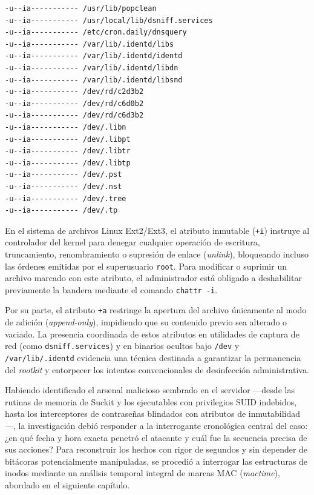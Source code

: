 \begin{lstlisting}[style=terminal,caption={Archivos con atributos especiales de inmutabilidad (+i) y adición (+a).},label={lst:lsattr_output}]
-u--ia----------- /usr/lib/popclean
-u--ia----------- /usr/local/lib/dsniff.services
-u--ia----------- /etc/cron.daily/dnsquery
-u--ia----------- /var/lib/.identd/libs
-u--ia----------- /var/lib/.identd/identd
-u--ia----------- /var/lib/.identd/libdn
-u--ia----------- /var/lib/.identd/libsnd
-u--ia----------- /dev/rd/c2d3b2
-u--ia----------- /dev/rd/c6d0b2
-u--ia----------- /dev/rd/c6d3b2
-u--ia----------- /dev/.libn
-u--ia----------- /dev/.libpt
-u--ia----------- /dev/.libtr
-u--ia----------- /dev/.libtp
-u--ia----------- /dev/.pst
-u--ia----------- /dev/.nst
-u--ia----------- /dev/.tree
-u--ia----------- /dev/.tp
\end{lstlisting}

En el sistema de archivos Linux Ext2/Ext3, el atributo inmutable (\texttt{+i}) instruye al controlador del kernel para denegar cualquier operación de escritura, truncamiento, renombramiento o supresión de enlace (\textit{unlink}), bloqueando incluso las órdenes emitidas por el superusuario \texttt{root}. Para modificar o suprimir un archivo marcado con este atributo, el administrador está obligado a deshabilitar previamente la bandera mediante el comando \texttt{chattr -i}. 

Por su parte, el atributo \texttt{+a} restringe la apertura del archivo únicamente al modo de adición (\textit{append-only}), impidiendo que su contenido previo sea alterado o vaciado. La presencia coordinada de estos atributos en utilidades de captura de red (como \texttt{dsniff.services}) y en binarios ocultos bajo \texttt{/dev} y \texttt{/var/lib/.identd} evidencia una técnica destinada a garantizar la permanencia del \textit{rootkit} y entorpecer los intentos convencionales de desinfección administrativa.

Habiendo identificado el arsenal malicioso sembrado en el servidor ---desde las rutinas de memoria de Suckit y los ejecutables con privilegios SUID indebidos, hasta los interceptores de contraseñas blindados con atributos de inmutabilidad---, la investigación debió responder a la interrogante cronológica central del caso: ¿en qué fecha y hora exacta penetró el atacante y cuál fue la secuencia precisa de sus acciones? Para reconstruir los hechos con rigor de segundos y sin depender de bitácoras potencialmente manipuladas, se procedió a interrogar las estructuras de inodos mediante un análisis temporal integral de marcas MAC (\textit{mactime}), abordado en el siguiente capítulo.

